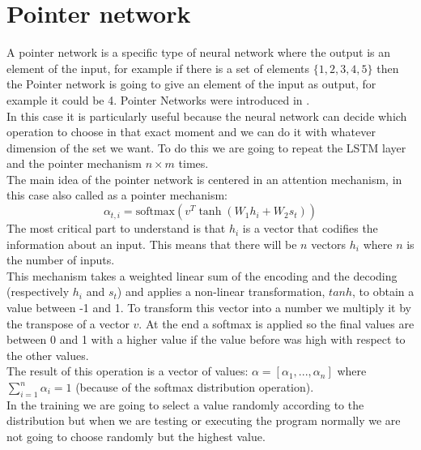 \documentclass[12pt]{book}
\begin{document}
\section{Pointer network}

A pointer network is a specific type of neural network where the output is an element of the input, for example if there is a set of elements $\{1,2,3,4,5\}$ then the Pointer network is going to give an element of the input as output, for example it could be 4. Pointer Networks were introduced in \cite{vinyals2015pointer}.\\
In this case it is particularly useful because the neural network can decide which operation to choose in that exact moment and we can do it with whatever dimension of the set we want. To do this we are going to repeat the LSTM layer and the pointer mechanism $n\times m$ times.\\
The main idea of the pointer network is centered in an attention mechanism, in this case also called as a pointer mechanism:
\[\alpha_{t,i}=\mathrm{softmax}(v^T\tanh(W_1h_i+W_2s_t))\]
The most critical part to understand is that $h_i$ is a vector that codifies the information about an input. This means that there will be $n$ vectors $h_i$ where $n$ is the number of inputs.\\
This mechanism takes a weighted linear sum of the encoding and the decoding (respectively $h_i$ and $s_t$) and applies a non-linear transformation, $tanh$, to obtain a value between -1 and 1. To transform this vector into a number we multiply it by the transpose of a vector $v$. At the end a softmax is applied so the final values are between 0 and 1 with a higher value if the value before was high with respect to the other values.\\
The result of this operation is a vector of values: $\alpha=[\alpha_1,...,\alpha_n]$ where $\sum_{i=1}^n\alpha_i=1$ (because of the softmax distribution operation).\\
In the training we are going to select a value randomly according to the distribution but when we are testing or executing the program normally we are not going to choose randomly but the highest value.
\end{document}

